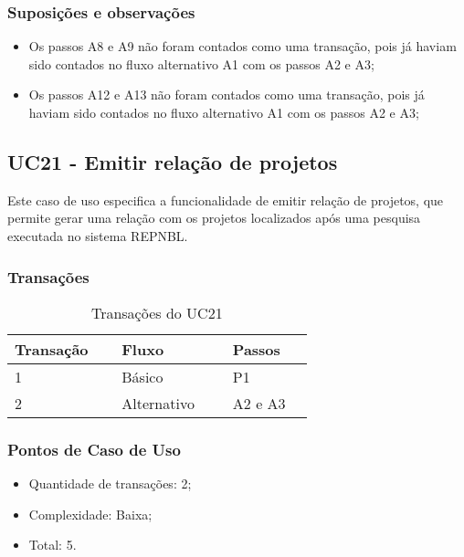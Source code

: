   \subsubsection{Suposições e observações}
  
  \begin{itemize}   
   \item Os passos A8 e A9 não foram contados como uma transação, pois já haviam sido contados no fluxo alternativo
      A1 com os passos A2 e A3;
   \item Os passos A12 e A13 não foram contados como uma transação, pois já haviam sido contados no fluxo alternativo
      A1 com os passos A2 e A3;
  \end{itemize}

  \vfill
  
\pagebreak
\subsection{UC21 - Emitir relação de projetos}
  
  Este caso de uso especifica a funcionalidade de emitir relação de projetos, que permite gerar uma relação com
  os projetos localizados após uma pesquisa executada no sistema REPNBL.
  
  \subsubsection{Transações}

  \begin{table*}[!h]
  \centering
  \caption{Transações do UC21}
  \label{uc21_transactions}
    \begin{tabular}{|p{0.20\linewidth}|p{0.25\linewidth}|p{0.20\linewidth}|}
    \hline
    \textbf{Transação} & \textbf{Fluxo} & \textbf{Passos} \\ 
    \hline
    1 & Básico & P1\\
    \hline
    2 & Alternativo & A2 e A3 \\
    \hline
    \end{tabular}
  \end{table*}

  \subsubsection{Pontos de Caso de Uso}

  \begin{itemize}
  \item Quantidade de transações: 2;
  \item Complexidade: Baixa;
  \item Total: 5.
  \end{itemize}

  \vfill